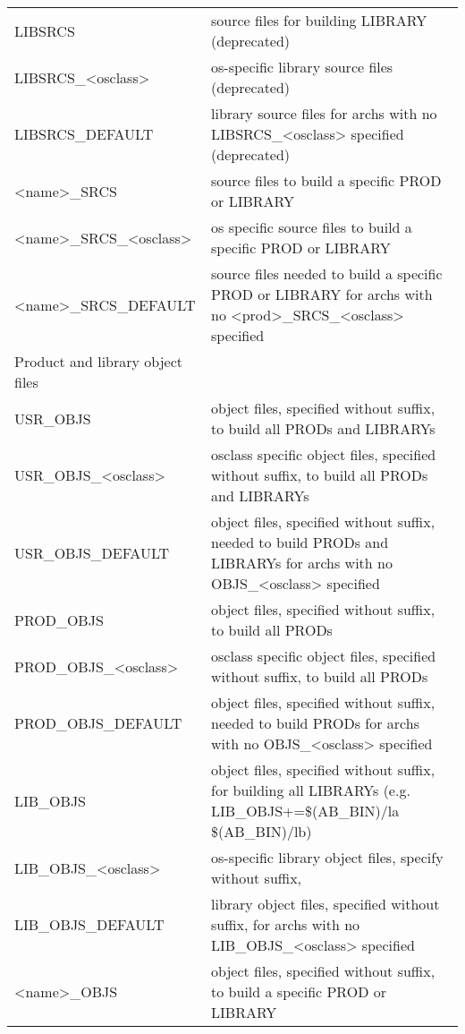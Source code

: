 \begin{center}
\begin{longtable}{p{2.94784in}p{3.76247in}}
LIBSRCS & source files for building LIBRARY (deprecated)\\
LIBSRCS\_\textless{}osclass\textgreater{} & os-specific library source files (deprecated)\\
LIBSRCS\_DEFAULT & library source files for archs with no LIBSRCS\_\textless{}osclass\textgreater{} specified (deprecated)\\
\textless{}name\textgreater{}\_SRCS & source files to build a specific PROD or LIBRARY\\
\textless{}name\textgreater{}\_SRCS\_\textless{}osclass\textgreater{} & os specific source files to build a specific PROD or LIBRARY\\
\textless{}name\textgreater{}\_SRCS\_DEFAULT & source files needed to build a specific PROD or LIBRARY for archs with no \textless{}prod\textgreater{}\_SRCS\_\textless{}osclass\textgreater{} specified\\
Product and library object files & \\
USR\_OBJS & object files, specified without suffix, to build all PRODs and LIBRARYs\\
USR\_OBJS\_\textless{}osclass\textgreater{} & osclass specific object files, specified without suffix, to build all PRODs and LIBRARYs\\
USR\_OBJS\_DEFAULT & object files, specified without suffix, needed to build PRODs and LIBRARYs for archs with no OBJS\_\textless{}osclass\textgreater{} specified\\
PROD\_OBJS & object files, specified without suffix, to build all PRODs\\
PROD\_OBJS\_\textless{}osclass\textgreater{} & osclass specific object files, specified without suffix, to build all PRODs\\
PROD\_OBJS\_DEFAULT & object files, specified without suffix, needed to build PRODs for archs with no OBJS\_\textless{}osclass\textgreater{} specified\\
LIB\_OBJS & object files, specified without suffix, for building all LIBRARYs (e.g. LIB\_OBJS+=\$(AB\_BIN)/la \$(AB\_BIN)/lb)\\
LIB\_OBJS\_\textless{}osclass\textgreater{} & os-specific library object files, specify without suffix,\\
LIB\_OBJS\_DEFAULT & library object files, specified without suffix, for archs with no LIB\_OBJS\_\textless{}osclass\textgreater{} specified\\
\textless{}name\textgreater{}\_OBJS & object files, specified without suffix, to build a specific PROD or LIBRARY\\

\end{longtable}
\end{center}
